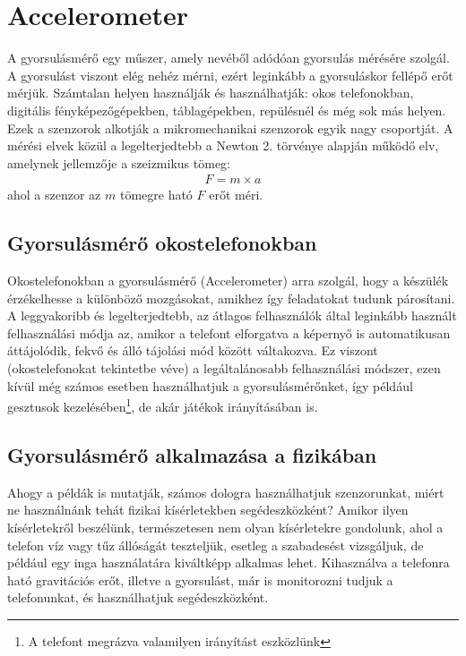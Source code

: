 \documentclass{thesis-ekf}
\theoremstyle{definition}
\theoremstyle{remark}
\begin{document}
\section{Accelerometer}
A gyorsulásmérő egy műszer, amely nevéből adódóan gyorsulás mérésére szolgál. A gyorsulást viszont elég nehéz mérni, ezért leginkább a gyorsuláskor fellépő erőt mérjük. Számtalan helyen használják és használhatják: okos telefonokban, digitális fényképezőgépekben, táblagépekben, repülésnél és még sok más helyen. Ezek a szenzorok alkotják a mikromechanikai szenzorok egyik nagy csoportját. A mérési elvek közül a legelterjedtebb a Newton 2. törvénye alapján működő elv, amelynek jellemzője a szeizmikus tömeg:
\begin{align*}
F=m\times a
\end{align*}
ahol a szenzor az $m$ tömegre ható $F$ erőt méri.
\subsection{Gyorsulásmérő okostelefonokban}
Okostelefonokban a gyorsulásmérő (Accelerometer) arra szolgál, hogy a készülék érzékelhesse a különböző mozgásokat, amikhez így feladatokat tudunk párosítani. A leggyakoribb és legelterjedtebb, az átlagos felhasználók által leginkább használt felhasználási módja az, amikor a telefont elforgatva a képernyő is automatikusan áttájolódik, fekvő és álló tájolási mód között váltakozva. Ez viszont (okostelefonokat tekintetbe véve) a legáltalánosabb felhasználási módszer, ezen kívül még számos esetben használhatjuk a gyorsulásmérőnket, így például gesztusok kezelésében\footnote{A telefont megrázva valamilyen irányítást eszközlünk}, de akár játékok irányításában is.
\subsection{Gyorsulásmérő alkalmazása a fizikában}
Ahogy a példák is mutatják, számos dologra használhatjuk szenzorunkat, miért ne használnánk tehát fizikai kísérletekben segédeszközként? Amikor ilyen kísérletekről beszélünk, természetesen nem olyan kísérletekre gondolunk, ahol a telefon víz vagy tűz állóságát teszteljük, esetleg a szabadesést vizsgáljuk, de például egy inga használatára kiváltképp alkalmas lehet. Kihasználva a telefonra ható gravitációs erőt, illetve a gyorsulást, már is monitorozni tudjuk a telefonunkat, és használhatjuk segédeszközként.
\end{document}
